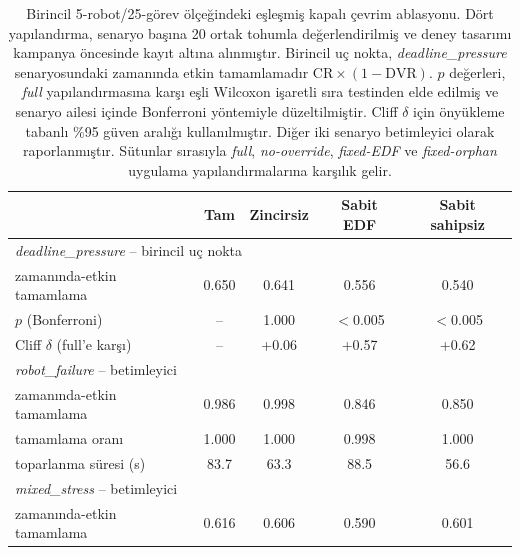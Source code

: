 \begin{table}[t]
\centering
\caption{Birincil 5-robot/25-görev ölçeğindeki eşleşmiş kapalı çevrim
ablasyonu. Dört yapılandırma, senaryo başına 20 ortak tohumla değerlendirilmiş
ve deney tasarımı kampanya öncesinde kayıt altına alınmıştır. Birincil uç nokta,
\textit{deadline\_pressure} senaryosundaki zamanında etkin tamamlamadır
$\mathrm{CR}\times(1-\mathrm{DVR})$. $p$ değerleri, \emph{full}
yapılandırmasına karşı eşli Wilcoxon işaretli sıra testinden elde edilmiş ve
senaryo ailesi içinde Bonferroni yöntemiyle düzeltilmiştir. Cliff $\delta$ için
önyükleme tabanlı \%95 güven aralığı kullanılmıştır. Diğer iki senaryo
betimleyici olarak raporlanmıştır. Sütunlar sırasıyla \emph{full},
\emph{no-override}, \emph{fixed-EDF} ve \emph{fixed-orphan} uygulama
yapılandırmalarına karşılık gelir.}
\label{tab:gazebo-ablation}
\small
\setlength{\tabcolsep}{4pt}
\begin{tabular}{l cccc}
\toprule
& \textbf{Tam} & \textbf{Zincirsiz} & \textbf{Sabit EDF} & \textbf{Sabit sahipsiz} \\
\midrule

\multicolumn{5}{l}{\textit{deadline\_pressure} -- birincil uç nokta} \\
\quad zamanında-etkin tamamlama & 0.650 & 0.641 & 0.556 & 0.540 \\
\quad $p$ (Bonferroni) & -- & 1.000 & $<$0.005 & $<$0.005 \\
\quad Cliff $\delta$ (full'e karşı) & -- & +0.06 & +0.57 & +0.62 \\
\midrule
\multicolumn{5}{l}{\textit{robot\_failure} -- betimleyici} \\
\quad zamanında-etkin tamamlama & 0.986 & 0.998 & 0.846 & 0.850 \\
\quad tamamlama oranı & 1.000 & 1.000 & 0.998 & 1.000 \\
\quad toparlanma süresi (s) & 83.7 & 63.3 & 88.5 & 56.6 \\
\midrule
\multicolumn{5}{l}{\textit{mixed\_stress} -- betimleyici} \\
\quad zamanında-etkin tamamlama & 0.616 & 0.606 & 0.590 & 0.601 \\
\bottomrule
\end{tabular}
\end{table}
